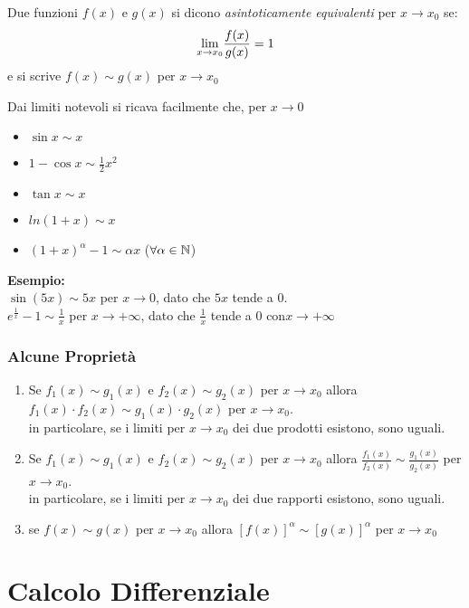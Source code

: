 \documentclass[12pt, a4paper, openany]{book}
\newcommand{\esempio}[1]{\begin{box_esempio} \textbf{Esempio: }#1\end{box_esempio}}
\newcommand{\definizione}[1]{\begin{box_definizione} #1 \end{box_definizione}}
\begin{document}
\definizione{
    Due funzioni $f(x)$ e $g(x)$ si dicono \emph{asintoticamente equivalenti} per $x \to x_0$ se:
    $$ \underset{x \to x_0}{\lim} \frac{f(x)}{g(x)} = 1$$
    e si scrive $f(x) \sim g(x)$ per $x\to x_0$
}
Dai limiti notevoli si ricava facilmente che, per $x \to 0$
\begin{itemize}
    \item $\sin x \sim x$
    \item $1 - \cos x \sim \frac{1}{2}x^2$
    \item $\tan x \sim x$
    \item $ln(1+x) \sim x$
    \item $(1+x)^\alpha -1 \sim \alpha x$ ($\forall \alpha \in \mathbb{N}$)
\end{itemize}
\esempio{
    \\$\sin(5x) \sim 5x$ per $x\to 0$, dato che $5x$ tende a 0.
    \\$e^{\frac{1}{x}}-1 \sim \frac{1}{x}$ per $x\to +\infty$, dato che $\frac{1}{x}$ tende a 0 con$x\to +\infty$
}
\subsection*{Alcune Proprietà}
\begin{enumerate}
    \item Se $f_1(x) \sim g_1(x)$ e $f_2(x) \sim g_2(x)$ per $x \to x_0$ allora $f_1(x) \cdot f_2(x) \sim g_1(x) \cdot g_2(x)$ per $x \to x_0$.
    \\in particolare, se i limiti per $x \to x_0$ dei due prodotti esistono, sono uguali.
    \item Se $f_1(x) \sim g_1(x)$ e $f_2(x) \sim g_2(x)$ per $x \to x_0$ allora $\frac{f_1(x)}{f_2(x)} \sim \frac{g_1(x)}{g_2(x)}$ per $x \to x_0$.
    \\in particolare, se i limiti per $x \to x_0$ dei due rapporti esistono, sono uguali.
    \item se $f(x) \sim g(x)$ per $x \to x_0$ allora $[f(x)]^\alpha \sim [g(x)]^\alpha$ per $x \to x_0$
\end{enumerate}

 
\chapter{Calcolo Differenziale}
\end{document}

